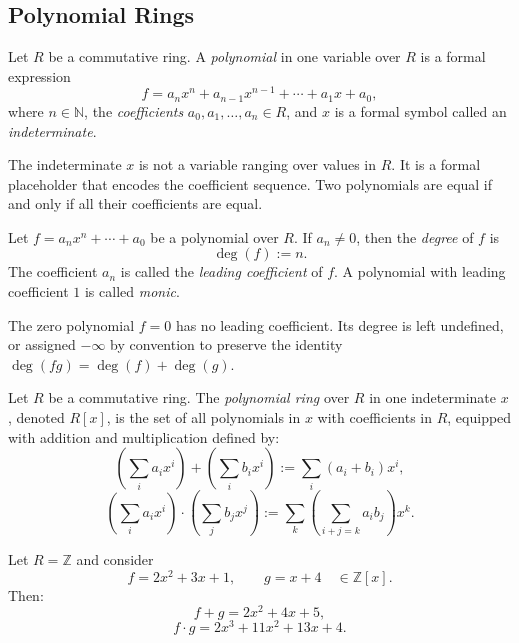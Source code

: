 \subsection{Polynomial Rings}

\begin{definition}[Polynomial]
Let $R$ be a commutative ring.
A \emph{polynomial} in one variable over $R$ is a formal expression
\[
f = a_n x^n + a_{n-1} x^{n-1} + \cdots + a_1 x + a_0,
\]
where $n \in \mathbb{N}$, the \emph{coefficients} $a_0, a_1, \dots, a_n \in R$,
and $x$ is a formal symbol called an \emph{indeterminate}.
\end{definition}

\begin{remark}
The indeterminate $x$ is not a variable ranging over values in $R$.
It is a formal placeholder that encodes the coefficient sequence.
Two polynomials are equal if and only if all their coefficients are equal.
\end{remark}

\begin{definition}[Degree]
Let $f = a_n x^n + \cdots + a_0$ be a polynomial over $R$.
If $a_n \neq 0$, then the \emph{degree} of $f$ is
\[
\deg(f) := n.
\]
The coefficient $a_n$ is called the \emph{leading coefficient} of $f$.
A polynomial with leading coefficient $1$ is called \emph{monic}.
\end{definition}

\begin{remark}
The zero polynomial $f = 0$ has no leading coefficient.
Its degree is left undefined, or assigned $-\infty$ by convention
to preserve the identity $\deg(fg) = \deg(f) + \deg(g)$.
\end{remark}

\begin{definition}
Let $R$ be a commutative ring.
The \emph{polynomial ring} over $R$ in one indeterminate $x$,
denoted $R[x]$, is the set of all polynomials in $x$ with
coefficients in $R$, equipped with addition and multiplication
defined by:
\[
\left(\sum_{i} a_i x^i\right) + \left(\sum_{i} b_i x^i\right)
:= \sum_{i} (a_i + b_i) x^i,
\]
\[
\left(\sum_{i} a_i x^i\right) \cdot \left(\sum_{j} b_j x^j\right)
:= \sum_{k} \left(\sum_{i+j=k} a_i b_j\right) x^k.
\]
\end{definition}

\begin{example}
Let $R = \mathbb{Z}$ and consider
\[
f = 2x^2 + 3x + 1, \qquad g = x + 4 \quad \in \mathbb{Z}[x].
\]
Then:
\[
f + g = 2x^2 + 4x + 5,
\]
\[
f \cdot g = 2x^3 + 11x^2 + 13x + 4.
\]
\end{example}

